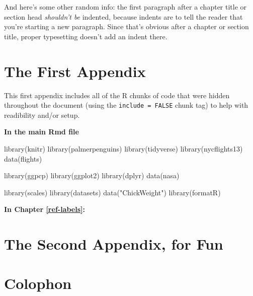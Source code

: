 \documentclass[print]{nuthesis}
\newenvironment{Shaded}{\begin{snugshade}}{\end{snugshade}}
\newcommand{\FunctionTok}[1]{\textcolor[rgb]{0.00,0.00,0.00}{#1}}
\newcommand{\NormalTok}[1]{#1}
\newcommand{\StringTok}[1]{\textcolor[rgb]{0.31,0.60,0.02}{#1}}
\begin{document}
And here's some other random info: the first paragraph after a chapter title or section head \emph{shouldn't be} indented, because indents are to tell the reader that you're starting a new paragraph. Since that's obvious after a chapter or section title, proper typesetting doesn't add an indent there.

\appendix

\hypertarget{the-first-appendix}{%
\chapter{The First Appendix}\label{the-first-appendix}}

This first appendix includes all of the R chunks of code that were hidden throughout the document (using the \texttt{include\ =\ FALSE} chunk tag) to help with readibility and/or setup.

\textbf{In the main Rmd file}

\begin{Shaded}
\begin{Highlighting}[]
\FunctionTok{library}\NormalTok{(knitr)}
\FunctionTok{library}\NormalTok{(palmerpenguins)}
\FunctionTok{library}\NormalTok{(tidyverse)}
\FunctionTok{library}\NormalTok{(nycflights13)}
\FunctionTok{data}\NormalTok{(flights)}

\FunctionTok{library}\NormalTok{(ggpcp)}
\FunctionTok{library}\NormalTok{(ggplot2)}
\FunctionTok{library}\NormalTok{(dplyr)}
\FunctionTok{data}\NormalTok{(nasa)}

\FunctionTok{library}\NormalTok{(scales)}
\FunctionTok{library}\NormalTok{(datasets)}
\FunctionTok{data}\NormalTok{(}\StringTok{"ChickWeight"}\NormalTok{)}
\FunctionTok{library}\NormalTok{(formatR)}
\end{Highlighting}
\end{Shaded}

\textbf{In Chapter \ref{ref-labels}:}

\hypertarget{the-second-appendix-for-fun}{%
\chapter{The Second Appendix, for Fun}\label{the-second-appendix-for-fun}}

\hypertarget{colophon}{%
\chapter*{Colophon}\label{colophon}}
\end{document}
